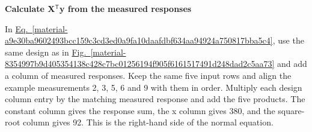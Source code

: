 \documentclass[11pt,a4paper]{article}
\begin{document}
\textbf{Calculate X\ensuremath{{}^{\mathsf T}}y from the measured responses}


In \hyperref[material-a9e30ba9602493bcc159c3cd3ed0a9fa10daafdbf634aa94924a750817bba5c4]{Eq.~\ref*{material-a9e30ba9602493bcc159c3cd3ed0a9fa10daafdbf634aa94924a750817bba5c4}}, use the same design as in \hyperref[material-8354997b9d405354138c428c7bc01256194f905f6161517491d248dad2c5aa73]{Fig.~\ref*{material-8354997b9d405354138c428c7bc01256194f905f6161517491d248dad2c5aa73}} and add a column of measured responses. Keep the same five input rows and align the example measurements 2, 3, 5, 6 and 9 with them in order. Multiply each design column entry by the matching measured response and add the five products. The constant column gives the response sum, the x column gives 380, and the square-root column gives 92. This is the right-hand side of the normal equation.
\end{document}
